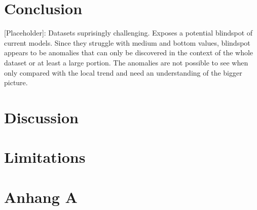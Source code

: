 \documentclass[12pt,oneside]{article}
\begin{document}
\section{Conclusion}

[Placeholder]: Datasets suprisingly challenging. Exposes a potential blindspot of current models. Since they struggle with medium and bottom values, blindspot appears to be anomalies that can only be discovered in the context of the whole dataset or at least a large portion. The anomalies are not possible to see when only compared with the local trend and need an understanding of the bigger picture.

\section{Discussion}

\section{Limitations}






\clearpage
\lhead{}
\printbibliography
{}


\clearpage
\appendix
\section{Anhang A}


\end{document}
